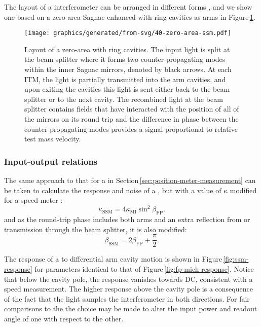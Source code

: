 The layout of a \SSM{} interferometer can be arranged in different forms \cite{Huttner2016}, and we show one based on a zero-area Sagnac enhanced with ring cavities as arms in Figure\,\ref{fig:zero-area-ssm}.

\begin{figure}
  \centering
  \texttt{[image: graphics/generated/from-svg/40-zero-area-ssm.pdf]}
  \caption[Layout of a zero-area \SSM{}]{\label{fig:zero-area-ssm}Layout of a zero-area \SSM{} with ring cavities. The input light is split at the beam splitter where it forms two counter-propagating modes within the inner Sagnac mirrors, denoted by black arrows. At each \gls{ITM}, the light is partially transmitted into the arm cavities, and upon exiting the cavities this light is sent either back to the beam splitter or to the next cavity. The recombined light at the beam splitter contains fields that have interacted with the position of all of the mirrors on its round trip and the difference in phase between the counter-propagating modes provides a signal proportional to relative test mass velocity.}
\end{figure} 

\subsubsection{Input-output relations}
The same approach to that for a \FPMI{} in Section\,\ref{sec:position-meter-measurement} can be taken to calculate the response and noise of a \SM{}, but with a value of $\kappa$ modified for a speed-meter \cite{Chen2003}:
\begin{equation}
  \kappa_{\text{SSM}} = 4 \kappa_{\text{MI}} \sin^2 \beta_{\text{FP}}.
\end{equation}
and as the round-trip phase includes both arms and an extra reflection from or transmission through the beam splitter, it is also modified:
\begin{equation}
  \beta_{\text{SSM}} = 2 \beta_{\text{FP}} + \frac{\pi}{2}.
\end{equation}

The response of a \SSM{} to differential arm cavity motion is shown in Figure\,\ref{fig:ssm-response} for parameters identical to that of Figure\,\ref{fig:fp-mich-response}. Notice that below the cavity pole, the response vanishes towards \gls{DC}, consistent with a speed measurement. The higher response above the cavity pole is a consequence of the fact that the light samples the interferometer in both directions. For fair comparisons to the \MI{} the choice may be made to alter the input power and readout angle of one with respect to the other.

